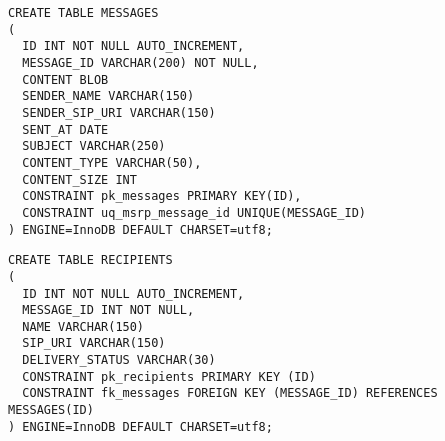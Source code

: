 \fontsize{10}{10}
\begin{verbatim}
CREATE TABLE MESSAGES
(
  ID INT NOT NULL AUTO_INCREMENT,
  MESSAGE_ID VARCHAR(200) NOT NULL,
  CONTENT BLOB
  SENDER_NAME VARCHAR(150)
  SENDER_SIP_URI VARCHAR(150)
  SENT_AT DATE
  SUBJECT VARCHAR(250)
  CONTENT_TYPE VARCHAR(50),
  CONTENT_SIZE INT
  CONSTRAINT pk_messages PRIMARY KEY(ID),
  CONSTRAINT uq_msrp_message_id UNIQUE(MESSAGE_ID)
) ENGINE=InnoDB DEFAULT CHARSET=utf8;
\end{verbatim}
\fontsize{12}{12}

\fontsize{10}{10}
\begin{verbatim}
CREATE TABLE RECIPIENTS
(
  ID INT NOT NULL AUTO_INCREMENT,
  MESSAGE_ID INT NOT NULL,
  NAME VARCHAR(150)
  SIP_URI VARCHAR(150)
  DELIVERY_STATUS VARCHAR(30)
  CONSTRAINT pk_recipients PRIMARY KEY (ID)
  CONSTRAINT fk_messages FOREIGN KEY (MESSAGE_ID) REFERENCES MESSAGES(ID)
) ENGINE=InnoDB DEFAULT CHARSET=utf8;
\end{verbatim}
\fontsize{12}{12}


